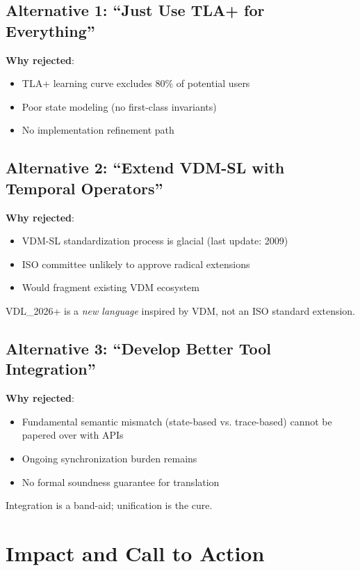 \documentclass[11pt]{article}
\begin{document}
\subsection{Alternative 1: ``Just Use TLA+ for Everything''}

\textbf{Why rejected}:
\begin{itemize}
\item TLA+ learning curve excludes 80\% of potential users
\item Poor state modeling (no first-class invariants)
\item No implementation refinement path
\end{itemize}

\subsection{Alternative 2: ``Extend VDM-SL with Temporal Operators''}

\textbf{Why rejected}:
\begin{itemize}
\item VDM-SL standardization process is glacial (last update: 2009)
\item ISO committee unlikely to approve radical extensions
\item Would fragment existing VDM ecosystem
\end{itemize}

VDL\_2026+ is a \textit{new language} inspired by VDM, not an ISO standard extension.

\subsection{Alternative 3: ``Develop Better Tool Integration''}

\textbf{Why rejected}:
\begin{itemize}
\item Fundamental semantic mismatch (state-based vs. trace-based) cannot be papered over with APIs
\item Ongoing synchronization burden remains
\item No formal soundness guarantee for translation
\end{itemize}

Integration is a band-aid; unification is the cure.

\section{Impact and Call to Action}
\end{document}
